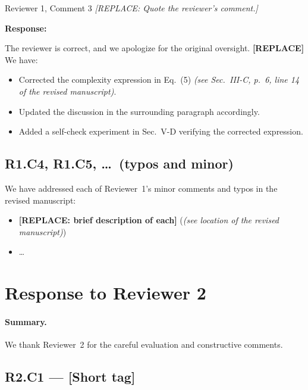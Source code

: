 \documentclass[11pt,letterpaper]{article}
\newcommand{\response}{\par\textbf{\color{responseaccent}Response:}\par}
\newcommand{\paperref}[1]{\textit{(see #1 of the revised manuscript)}}
\begin{document}
\begin{reviewercomment}{Reviewer 1, Comment 3}
\textit{[REPLACE: Quote the reviewer's comment.]}
\end{reviewercomment}

\response The reviewer is correct, and we apologize for the original
oversight. \textbf{[REPLACE]} We have:

\begin{itemize}[itemsep=2pt,topsep=2pt]
    \item Corrected the complexity expression in Eq.~(5)
          \paperref{Sec.~III-C, p.~6, line 14}.
    \item Updated the discussion in the surrounding paragraph
          accordingly.
    \item Added a self-check experiment in Sec.~V-D verifying the
          corrected expression.
\end{itemize}

\subsection*{R1.C4, R1.C5, \ldots\ (typos and minor)}

We have addressed each of Reviewer~1's minor comments and typos in the
revised manuscript:

\begin{itemize}[itemsep=2pt,topsep=2pt]
    \item \textbf{[REPLACE: brief description of each]} (\paperref{location})
    \item \ldots
\end{itemize}

\section*{Response to Reviewer 2}

\paragraph{Summary.} We thank Reviewer~2 for the careful evaluation and
constructive comments.

\subsection*{R2.C1 --- [Short tag]}
\end{document}
